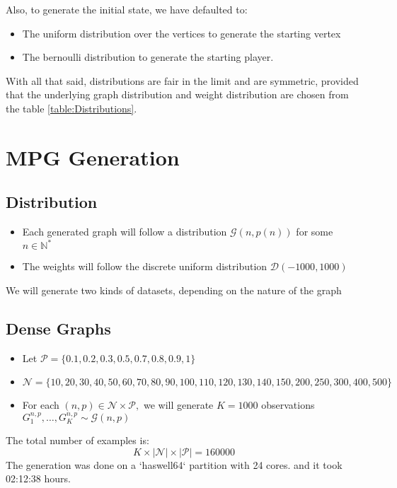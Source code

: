 \FloatBarrier
Also, to generate the initial state, we have defaulted to:
\begin{itemize}
	\item The uniform distribution over the vertices to generate the starting vertex
	\item The bernoulli distribution to generate the starting player.
\end{itemize}
With all that said, distributions are fair in the limit and are symmetric, provided that the underlying graph distribution and weight distribution are chosen from the table \ref{table:Distributions}.

\section{MPG Generation}
\label{section:MPG:Generation}
\subsection{Distribution}
\begin{itemize}
	\item Each generated graph will follow a distribution $\mathcal{G}(n,p(n))$  for some $n\in\mathbb{N}^*$
	\item The weights will follow the discrete uniform distribution $\mathcal{D}(-1000,1000)$

\end{itemize}

We will generate two kinds of datasets, depending on the nature of the graph

\subsection{Dense Graphs}
\begin{itemize}
	\item Let $\mathcal{P}=\{0.1,0.2,0.3,0.5,0.7,0.8,0.9,1\}$
	\item $\mathcal{N}=\{10,20,30,40,50,60,70,80,90,100,110,120,130,140,150,200,250,300,400,500\}$
	\item For each $(n,p)\in \mathcal{N}\times \mathcal{P},$ we will generate $K=1000$ observations $G^{n,p}_1,\dots,G^{n,p}_{K} \sim \mathcal{G}(n,p)$ 
\end{itemize} 

The total number of examples is:
$$
K\times\lvert \mathcal{N} \rvert \times \lvert \mathcal{P}\rvert=160000
$$
The generation was done on a `haswell64` partition with 24 cores. and it took 02:12:38 hours.

